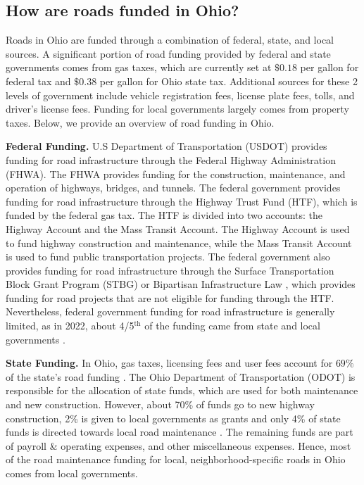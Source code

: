 \subsection{How are roads funded in Ohio?}

Roads in Ohio are funded through a combination of federal, state, and local sources. A significant portion of road funding provided by federal and state governments comes from gas taxes, which are currently set at $\$0.18$ per gallon for federal tax and $\$0.38$ per gallon for Ohio state tax. Additional sources for these 2 levels of government include vehicle registration fees, license plate fees, tolls, and driver's license fees. Funding for local governments largely comes from property taxes. Below, we provide an overview of road funding in Ohio.

{\bf Federal Funding.} U.S Department of Transportation (USDOT) provides funding for road infrastructure through the Federal Highway Administration (FHWA). The FHWA provides funding for the construction, maintenance, and operation of highways, bridges, and tunnels. The federal government provides funding for road infrastructure through the Highway Trust Fund (HTF), which is funded by the federal gas tax. The HTF is divided into two accounts: the Highway Account and the Mass Transit Account. The Highway Account is used to fund highway construction and maintenance, while the Mass Transit Account is used to fund public transportation projects. The federal government also provides funding for road infrastructure through the Surface Transportation Block Grant Program (STBG) or Bipartisan Infrastructure Law \citep{USDOT_BIL_Ohio}, which provides funding for road projects that are not eligible for funding through the HTF. Nevertheless, federal government funding for road infrastructure is generally limited, as in 2022, about 4/5$^\text{th}$ of the funding came from state and local governments \citep{pgpf_htf_explained}.

{\bf State Funding.}
In Ohio, gas taxes, licensing fees and user fees account for $69\%$ of the state's road funding \citep{boesen2021}. The Ohio Department of Transportation (ODOT) is responsible for the allocation of state funds, which are used for both maintenance and new construction. However, about 70\% of funds go to new highway construction, 2\% is given to local governments as grants and only 4\% of state funds is directed towards local road maintenance \citep{odot2023}. The remaining funds are part of payroll \& operating expenses, and other miscellaneous expenses. Hence, most of the road maintenance funding for local, neighborhood-specific roads in Ohio comes from local governments.


